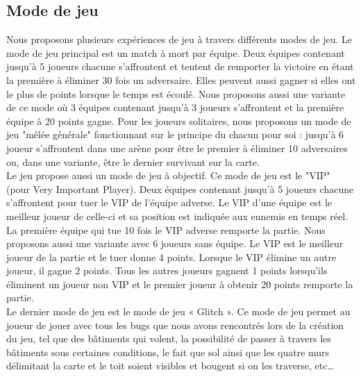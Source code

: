 \documentclass[12pt, titlepage]{article}
\begin{document}
\begin{spacing}{1.5}
\subsection{Mode de jeu}

Nous proposons plusieurs expériences de jeu à travers différents modes de jeu. Le mode de jeu principal est un match à mort par équipe. Deux équipes contenant jusqu'à 5 joueurs chacune s'affrontent et tentent de remporter la victoire en étant la première à éliminer 30 fois un adversaire. Elles peuvent aussi gagner si elles ont le plus de points lorsque le temps est écoulé. Nous proposons aussi une variante de ce mode où 3 équipes contenant jusqu'à 3 joueurs s'affrontent et la première équipe à 20 points gagne. Pour les joueurs solitaires, nous proposons un mode de jeu "mêlée générale" fonctionnant sur le principe du chacun pour soi : jusqu'à 6 joueur s'affrontent dans une arène pour être le premier à éliminer 10 adversaires ou, dans une variante, être le dernier survivant sur la carte. \\

Le jeu propose aussi un mode de jeu à objectif. Ce mode de jeu est le "VIP" (pour Very Important Player). Deux équipes contenant jusqu'à 5 joueurs chacune s'affrontent pour tuer le VIP de l'équipe adverse. Le VIP d'une équipe est le meilleur joueur de celle-ci et sa position est indiquée aux ennemis en temps réel. La première équipe qui tue 10 fois le VIP adverse remporte la partie. Nous proposons aussi une variante avec 6 joueurs sans équipe. Le VIP est le meilleur joueur de la partie et le tuer donne 4 points. Lorsque le VIP élimine un autre joueur, il gagne 2 points. Tous les autres joueurs gagnent 1 points lorsqu'ils éliminent un joueur non VIP et le premier joueur à obtenir 20 points remporte la partie. \\

Le dernier mode de jeu est le mode de jeu « Glitch ». Ce mode de jeu permet au joueur de jouer avec tous les bugs que nous avons rencontrés lors de la création du jeu, tel que des bâtiments qui volent, la possibilité de passer à travers les bâtiments sous certaines conditions, le fait que sol ainsi que les quatre murs délimitant la carte et le toit soient visibles et bougent si on les traverse, etc… \\


\end{spacing}
\end{document}

